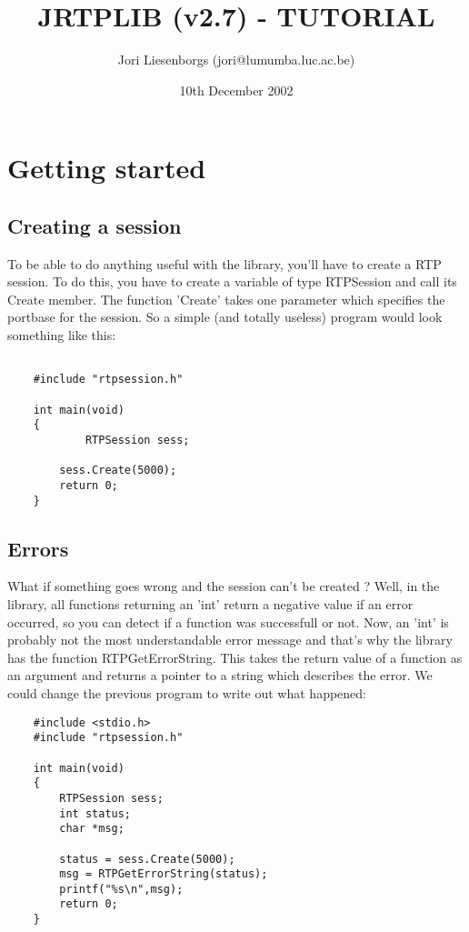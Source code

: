 


\author{Jori Liesenborgs (jori@lumumba.luc.ac.be)}
\title{JRTPLIB (v2.7) - TUTORIAL}
\date{10th December 2002}
\maketitle

\section{Getting started}

\subsection{Creating a session}

To be able to do anything useful with the library, you'll have to create a RTP
session. To do this, you have to create a variable of type RTPSession and call
its Create member. The function 'Create' takes one parameter which specifies
the portbase for the session. So a simple (and totally useless) program would
look something like this:
    \begin{verbatim}

    #include "rtpsession.h"
        
    int main(void)
    {
            RTPSession sess;
        
        sess.Create(5000);
        return 0;
    }
    \end{verbatim}

\subsection{Errors}

What if something goes wrong and the session can't be created ? Well, in the
library, all functions returning an 'int' return a negative value if an error
occurred, so you can detect if a function was successfull or not. Now, an
'int' is probably not the most understandable error message and that's why the
library has the function RTPGetErrorString. This takes the return value of a
function as an argument and returns a pointer to a string which describes the
error. We could change the previous program to write out what happened:
    \begin{verbatim}
    #include <stdio.h>
    #include "rtpsession.h"
        
    int main(void)
    {
        RTPSession sess;
        int status;
        char *msg;
            
        status = sess.Create(5000);
        msg = RTPGetErrorString(status);
        printf("%s\n",msg);
        return 0;
    }
    \end{verbatim}

